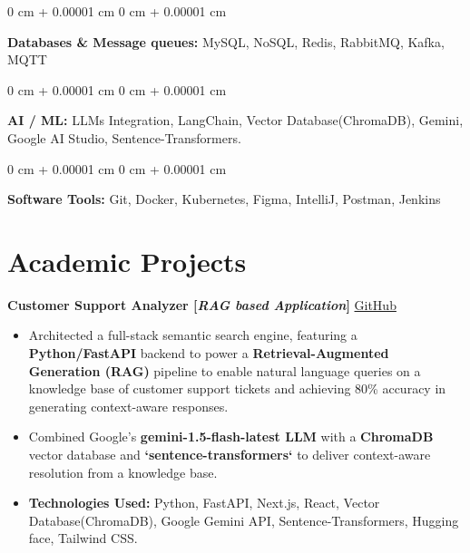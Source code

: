 \documentclass[10pt, letterpaper]{article}
\newenvironment{highlights}{
    \begin{itemize}[
        topsep=0.10 cm,     %
        parsep=0.10 cm,     %
        partopsep=0pt,      %
        itemsep=0.03cm,     %
        leftmargin=0 cm + 10pt  %
    ]
}{
    \end{itemize}
}
\newenvironment{onecolentry}{
    \begin{adjustwidth}{
        0 cm + 0.00001 cm
    }{
        0 cm + 0.00001 cm
    }
}{
    \end{adjustwidth}
}
\begin{document}
        \vspace{0.1 cm}
        
        \begin{onecolentry}
        \textbf{Databases \& Message queues:} MySQL, NoSQL, Redis, RabbitMQ, Kafka, MQTT \  %
        \end{onecolentry}
        
        \vspace{0.1 cm}

        \begin{onecolentry}
            \textbf{AI / ML:} LLMs Integration, LangChain, Vector Database(ChromaDB), Gemini, Google AI Studio, Sentence-Transformers. \  %
            \end{onecolentry}
            
            \vspace{0.1 cm}
        
        \begin{onecolentry}
        \textbf{Software Tools:} Git, Docker, Kubernetes, Figma, IntelliJ, Postman, Jenkins \\  %
        \vspace{0.1 cm}
        \end{onecolentry}


    \section{Academic Projects}

        \noindent
        \textbf{Customer Support Analyzer [\textit{RAG based Application}]} \hfill \href{https://github.com/tushar-fs/customer-support-analyzer}{\small GitHub}
        
        \begin{highlights}
            \item Architected a full-stack semantic search engine, featuring a \textbf{Python/FastAPI} backend to power a \textbf{Retrieval-Augmented Generation (RAG)} pipeline to enable natural language queries on a knowledge base of customer support tickets and achieving 80\% accuracy in generating context-aware responses.
            \item Combined Google's \textbf{gemini-1.5-flash-latest LLM} with a \textbf{ChromaDB} vector database and \textbf{`sentence-transformers`} to deliver context-aware resolution from a knowledge base.
            \item \textbf{Technologies Used:} Python, FastAPI, Next.js, React, Vector Database(ChromaDB), Google Gemini API, Sentence-Transformers, Hugging face, Tailwind CSS.
        \end{highlights}
\end{document}
